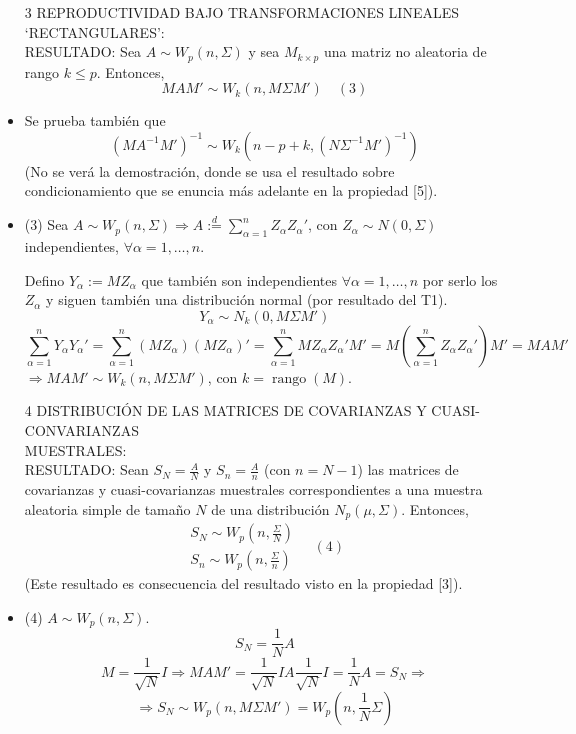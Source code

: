 \documentclass[11pt,a4paper]{article}
\begin{document}
\begin{itemize}
\item[3] REPRODUCTIVIDAD BAJO TRANSFORMACIONES LINEALES `RECTANGULARES': \\
RESULTADO: Sea $A \sim W_{p}(n, \Sigma)$ y sea $M_{k \times p}$ una matriz no aleatoria de rango $k \leq p$. Entonces,
$$MAM' \sim W_{k}(n, M \Sigma M') \quad (3)$$

\item Se prueba también que
$$(MA^{-1}M')^{-1} \sim W_{k}(n-p+k, (N\Sigma^{-1}M')^{-1})$$
(No se verá la demostración, donde se usa el resultado sobre condicionamiento que se enuncia más adelante en la propiedad [5]).

\item (3) Sea $A \sim W_{p}(n, \Sigma) \Rightarrow A \overset{d}{:=} \sum_{\alpha=1}^{n} Z_{\alpha}Z_{\alpha}'$, con $Z_{\alpha} \sim N(0, \Sigma)$ independientes, $\forall \alpha = 1, \dots, n$.

Defino $Y_{\alpha} := MZ_{\alpha}$ que también son independientes $\forall \alpha = 1, \dots, n$ por serlo los $Z_{\alpha}$ y siguen también una distribución normal (por resultado del T1).
$$Y_{\alpha} \sim N_{k}(0, M \Sigma M')$$
$$\sum_{\alpha=1}^{n} Y_{\alpha}Y_{\alpha}' = \sum_{\alpha=1}^{n} (MZ_{\alpha})(MZ_{\alpha})' = \sum_{\alpha=1}^{n} MZ_{\alpha}Z_{\alpha}'M' = M(\sum_{\alpha=1}^{n} Z_{\alpha}Z_{\alpha}')M' = MAM'$$
$\Rightarrow MAM' \sim W_{k}(n, M \Sigma M')$, con $k = \operatorname{rango}(M)$.

\item[4] DISTRIBUCIÓN DE LAS MATRICES DE COVARIANZAS Y CUASI-CONVARIANZAS \\ MUESTRALES: \\
RESULTADO: Sean $S_{N} = \frac{A}{N}$ y $S_{n} = \frac{A}{n}$ (con $n=N-1$) las matrices de covarianzas y cuasi-covarianzas muestrales correspondientes a una muestra aleatoria simple de tamaño $N$ de una distribución $N_{p}(\mu, \Sigma)$. Entonces,
$$\begin{aligned}
S_{N} \sim W_{p}(n, \frac{\Sigma}{N}) \\
S_{n} \sim W_{p}(n, \frac{\Sigma}{n})
\end{aligned} \quad (4)$$
(Este resultado es consecuencia del resultado visto en la propiedad [3]).

\item (4) $A \sim W_{p}(n, \Sigma)$.
$$S_{N} = \frac{1}{N}A$$
$$M = \frac{1}{\sqrt{N}} I \Rightarrow MAM' = \frac{1}{\sqrt{N}} I A \frac{1}{\sqrt{N}} I = \frac{1}{N} A = S_{N} \Rightarrow$$
$$\Rightarrow S_{N} \sim W_{p}(n, M \Sigma M') = W_{p}(n, \frac{1}{N}\Sigma)$$


\end{itemize}
\end{document}
